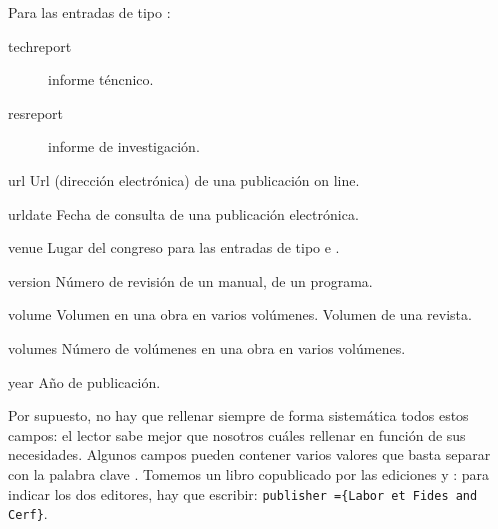 \begin{choix}
					Para las entradas de tipo : \nopagebreak
					\begin{description}
						\item[techreport]informe
                                                  téncnico.
						\item[resreport]informe
                                                  de investigación.
					\end{description}
					
	\item[url] Url (dirección electrónica) de una publicación on line. 
   	\item[urldate] Fecha de consulta de una publicación electrónica. 
   	\item[venue] Lugar del congreso para las entradas de tipo  e . 
   	\item[version] Número de revisión de un manual, de un programa. 
   	\item[volume] Volumen en una obra en varios volúmenes. Volumen
          de una revista. 
   	\item[volumes] Número de volúmenes en una obra en varios volúmenes. 
   	\item[year] Año de publicación. 				
\end{choix}


Por supuesto, no hay que rellenar siempre de forma sistemática todos
estos campos: el lector sabe mejor que nosotros cuáles rellenar en
función de sus necesidades. Algunos campos pueden contener varios
valores que basta separar con la palabra clave . Tomemos un
libro copublicado por las ediciones  y
: para indicar los dos editores, hay que escribir:
\verb|publisher ={Labor et Fides and Cerf}|.



